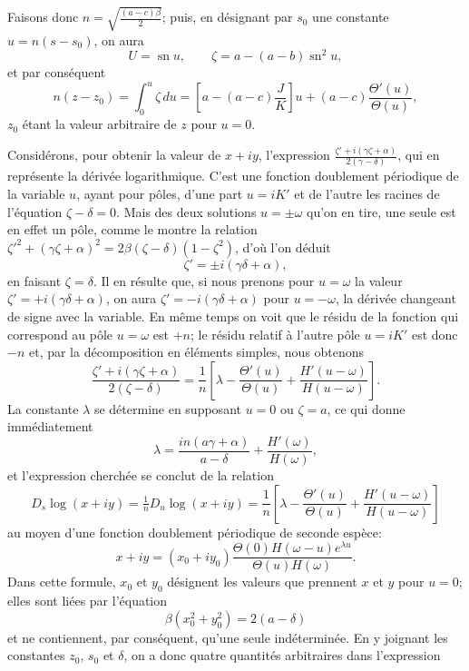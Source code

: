 \documentclass[11pt,leqno,oneside,letterpaper]{book}[2005/09/16]
\DeclareMathOperator{\sn}{sn}
\begin{document}
Faisons donc $n = \sqrt{ \frac{(a-c)\beta}{2} }$; puis, en d\'esignant par $s_0$ une constante
$u = n(s - s_0)$, on aura
\[
U = \sn u, \qquad
\zeta = a - (a - b)\sn^2 u,
\]
et par cons\'equent
\[
n(z - z_0) = \int^u_0 \zeta \,du = \left[ a - (a - c)\frac{J}{K} \right] u
  + (a - c) \frac{ \Theta'(u) }{ \Theta(u) },
\]
$z_0$ \'etant la valeur arbitraire de $z$ pour $u = 0$.

Consid\'erons, pour obtenir la valeur de $x+iy$, l'expression
$\frac{\zeta' + i(\gamma\zeta + \alpha)}{2(\gamma - \delta)}$, qui en repr\'esente la d\'eriv\'ee logarithmique. C'est une fonction
doublement p\'eriodique de la variable $u$, ayant pour p\^oles, d'une part
$u = iK'$ et de l'autre les racines de l'\'equation $\zeta-\delta=0$. Mais des deux
solutions $u=\pm \omega$ qu'on en tire, une seule est en effet un p\^ole, comme le
montre la relation $\zeta'^2 + (\gamma\zeta + \alpha)^2 = 2\beta(\zeta - \delta)(1 - \zeta^2)$, d'o\`u l'on d\'eduit
\[
\zeta' = \pm i(\gamma\delta + \alpha),
\]
en faisant $\zeta = \delta$. Il en r\'esulte que, si nous prenons pour $u = \omega$ la valeur
$\zeta' = +i(\gamma\delta + \alpha)$, on aura $\zeta' = -i(\gamma\delta + \alpha)$ pour $u=-\omega$, la d\'eriv\'ee
changeant de signe avec la variable. En m\^eme temps on voit que le r\'esidu
de la fonction qui correspond au p\^ole $u = \omega$ est $+n$; le r\'esidu relatif \`a
l'autre p\^ole $u = iK'$ est donc $-n$ et, par la d\'ecomposition en \'el\'ements
simples, nous obtenons
\[
\frac{ \zeta' + i(\gamma\zeta + \alpha) }
     { 2(\zeta - \delta) } =
  \frac{1}{n} \left[ \lambda - \frac{\Theta'(u)}{\Theta(u)}
                      + \frac{H'(u - \omega)}{H(u - \omega)} \right].
\]
La constante $\lambda$ se d\'etermine en supposant $u = 0$ ou $\zeta=a$, ce qui donne
imm\'ediatement
\[
\lambda = \frac{in(a\gamma + \alpha)}{a - \delta}+\frac{H'(\omega)}{H(\omega)},
\]
et l'expression cherch\'ee se conclut de la relation
\[
D_s\log(x+iy) = \tfrac{1}{n}D_u\log(x+iy)
  = \frac{1}{n}\left[\lambda-\frac{\Theta'(u)}{\Theta(u)}+\frac{H'(u-\omega)}{H(u-\omega)}\right]
\]
au moyen d'une fonction doublement p\'eriodique de seconde esp\`ece:
\[
x+iy = (x_0+iy_0) \frac{\Theta(0)H(\omega-u)e^{\lambda u}}{\Theta(u)H(\omega)}.
\]
Dans cette formule, $x_0$ et $y_0$ d\'esignent les valeurs que prennent $x$ et $y$ pour
$u = 0$; elles sont li\'ees par l'\'equation
\[
\beta(x_0^2+y_0^2)=2(a-\delta)
\]
et ne contiennent, par cons\'equent, qu'une seule ind\'etermin\'ee. En y joignant
les constantes $z_0$, $s_0$ et $\delta$, on a donc quatre quantit\'es arbitraires dans l'expression
\end{document}
